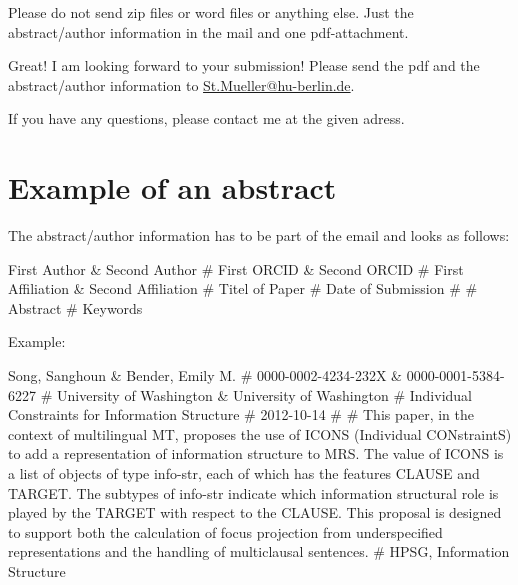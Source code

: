 \documentclass[11pt,a4paper,fleqn]{article}
\begin{document}
Please do not send zip files
or word files or anything else. Just the abstract/author information in the mail and one pdf-attachment.



Great! I am looking forward to your submission!
Please send the pdf and the abstract/author information to
\href{mailto:St.Mueller@hu-berlin.de}{St.Mueller@hu-berlin.de}. 


If you have any questions, please contact me at the given adress.



\section{Example of an abstract}

The abstract/author information has to be part of the email and looks as follows:

First Author \& Second Author \# First ORCID \& Second ORCID \# First Affiliation \& Second Affiliation \# Titel of Paper \# Date of
Submission \# \# Abstract \# Keywords

\bigskip

Example:

\medskip
\noindent
Song, Sanghoun \& Bender, Emily M. \# 0000-0002-4234-232X \& 0000-0001-5384-6227 \# University of Washington \& University of Washington \#
Individual Constraints for Information Structure \# 2012-10-14 \# \#
This paper, in the context of multilingual MT, proposes the use of ICONS
(Individual CONstraintS) to add a representation of information structure to
MRS. The value of ICONS is a list of objects of type info-str, each of which
has the features CLAUSE and TARGET. The subtypes of info-str indicate
which information structural role is played by the TARGET with respect
to the CLAUSE. This proposal is designed to support both the calculation
of focus projection from underspecified representations and the handling of
multiclausal sentences. \# HPSG, Information Structure

\medskip



% 
%
\end{document}
